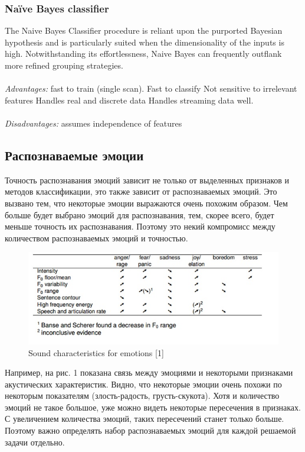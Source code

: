 \documentclass[14pt]{extarticle}
\begin{document}
\subsubsection{Naïve Bayes classifier}
The Naive Bayes Classifier procedure is reliant upon the purported Bayesian hypothesis and is particularly suited when the dimensionality of the inputs is high. Notwithstanding its effortlessness, Naive Bayes can frequently outflank more refined grouping strategies.
\\
\\
\emph{Advantages:} fast to train (single scan). Fast to classify Not sensitive to irrelevant features Handles real and discrete data Handles streaming data well.
\\
\\
\emph{Disadvantages:} assumes independence of features



\subsection{Распознаваемые эмоции}
Точность распознавания эмоций зависит не только от выделенных признаков и методов классификации, это также зависит от распознаваемых эмоций. Это вызвано тем, что некоторые эмоции выражаются очень похожим образом. Чем больше будет выбрано эмоций для распознавания, тем, скорее всего, будет меньше точность их распознавания. Поэтому это некий компромисс между количеством распознаваемых эмоций и точностью.
\begin{figure}[t]
	\centering
	\includegraphics[scale=0.8]{emotion-table-example}
	\caption{Sound characteristics for emotions [1]}
	\label{fig:emotion-table-example}
\end{figure}

Например, на рис. 1 показана связь между эмоциями и некоторыми признаками акустических характеристик. Видно, что некоторые эмоции очень похожи по некоторым показателям (злость-радость, грусть-скукота). Хотя и количество эмоций не такое большое, уже можно видеть некоторые пересечения в признаках. С увеличением количества эмоций, таких пересечений станет только больше. Поэтому важно определять набор распознаваемых эмоций для каждой решаемой задачи отдельно.
\end{document}
